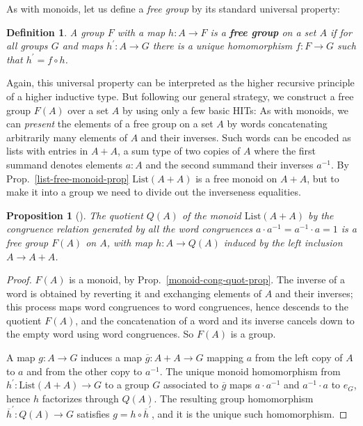 \documentclass{amsart}
\theoremstyle{plain}
\numberwithin{equation}{section} %
\numberwithin{figure}{section} %
\theoremstyle{plain}
\theoremstyle{plain}
\theoremstyle{plain}
\theoremstyle{plain}
\theoremstyle{plain}
\newtheorem{prop}[thm]{Proposition} %
\theoremstyle{plain}
\newtheorem{Def}[thm]{Definition} %
\theoremstyle{remark}
\theoremstyle{remark}
\theoremstyle{remark}
\begin{document}
As with monoids, let us define a \textit{free group} by its standard universal property:
\begin{Def}   %
A group $F$ with a map $h : A \rightarrow F$ is a \textbf{free group} on a set $A$ if for all groups $G$ and maps $h^\prime : A \rightarrow G$ there is a unique homomorphism $f : F \rightarrow G$ such that $h^\prime = f \circ h$.
\end{Def}

Again, this universal property can be interpreted as the higher recursive principle of a higher inductive type. But following our general strategy, we construct a free group $F(A)$ over a set $A$ by using only a few basic HITs:
As with monoids, we can \textit{present} the elements of a free group on a set $A$ by words concatenating arbitrarily many elements of $A$ and their inverses. Such words can be encoded as lists with entries in $A + A$, a sum type of two copies of $A$ where the first summand denotes elements $a : A$ and the second summand their inverses $a^{-1}$. By Prop.~\ref{list-free-monoid-prop} $\mathrm{List}(A + A)$ is a free monoid on $A + A$, but to make it into a group we need to divide out the inverseness equalities.
\begin{prop} [{\cite[Thm.6.11.7]{HoTTBook}}] \label{free-word-group-prop}
The quotient $Q(A)$ of the monoid $\mathrm{List}(A + A)$ by the congruence relation generated by all the word congruences $a \cdot a^{-1} = a^{-1} \cdot a = 1$ is a free group $F(A)$ on $A$, with map $h : A \rightarrow Q(A)$ induced by the left inclusion $A \rightarrow A + A$.
\end{prop}
\begin{proof}
$F(A)$ is a monoid, by Prop.~\ref{monoid-cong-quot-prop}. The inverse of a word is obtained by reverting it and exchanging elements of $A$ and their inverses; this process maps word congruences to word congruences, hence descends to the quotient $F(A)$, and the concatenation of a word and its inverse cancels down to the empty word using word congruences. So $F(A)$ is a group. 

A map $g : A \rightarrow G$ induces a map $\overline{g} : A + A \rightarrow G$ mapping $a$ from the left copy of $A$ to $a$ and from the other copy to $a^{-1}$. The unique monoid homomorphism from $h^\prime : \mathrm{List}(A + A) \rightarrow G$ to a group $G$ associated to $\overline{g}$ maps $a \cdot a^{-1}$ and $a^{-1} \cdot a$ to $e_G$, hence $h$ factorizes through $Q(A)$. The resulting group homomorphism $\overline{h}^\prime : Q(A) \rightarrow G$ satisfies $g = h \circ \overline{h}^\prime$, and it is the unique such homomorphism. 
\end{proof}
\end{document}

